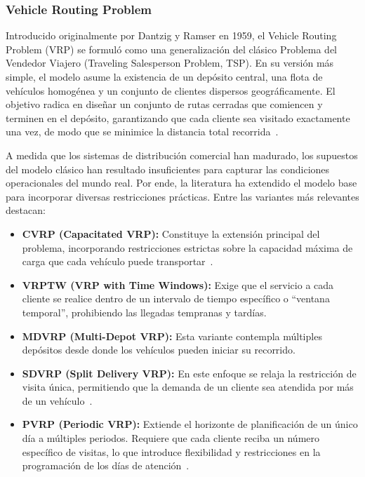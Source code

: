 \subsubsection{Vehicle Routing Problem} \label{sec:VehicleRoutingProblem}
Introducido originalmente por Dantzig y Ramser en 1959, el Vehicle Routing Problem (VRP) se formuló como una generalización del clásico Problema del Vendedor Viajero (Traveling Salesperson Problem, TSP). En su versión más simple, el modelo asume la existencia de un depósito central, una flota de vehículos homogénea y un conjunto de clientes dispersos geográficamente. El objetivo radica en diseñar un conjunto de rutas cerradas que comiencen y terminen en el depósito, garantizando que cada cliente sea visitado exactamente una vez, de modo que se minimice la distancia total recorrida~\cite{Pangaribuan}.

A medida que los sistemas de distribución comercial han madurado, los supuestos del modelo clásico han resultado insuficientes para capturar las condiciones operacionales del mundo real. Por ende, la literatura ha extendido el modelo base para incorporar diversas restricciones prácticas. Entre las variantes más relevantes destacan:

\begin{itemize}
    \item \textbf{CVRP (Capacitated VRP):} Constituye la extensión principal del problema, incorporando restricciones estrictas sobre la capacidad máxima de carga que cada vehículo puede transportar~\cite{EKSIOGLU20091472}.
    
    \item \textbf{VRPTW (VRP with Time Windows):} Exige que el servicio a cada cliente se realice dentro de un intervalo de tiempo específico o \enquote{ventana temporal}, prohibiendo las llegadas tempranas y tardías.
    
    \item \textbf{MDVRP (Multi-Depot VRP):} Esta variante contempla múltiples depósitos desde donde los vehículos pueden iniciar su recorrido.
    
    \item \textbf{SDVRP (Split Delivery VRP):} En este enfoque se relaja la restricción de visita única, permitiendo que la demanda de un cliente sea atendida por más de un vehículo~\cite{Pangaribuan}.
    
    \item \textbf{PVRP (Periodic VRP):} Extiende el horizonte de planificación de un único día a múltiples periodos. Requiere que cada cliente reciba un número específico de visitas, lo que  introduce flexibilidad y restricciones en la programación de los días de atención~\cite{HEMMELMAYR2009791}.
\end{itemize}

